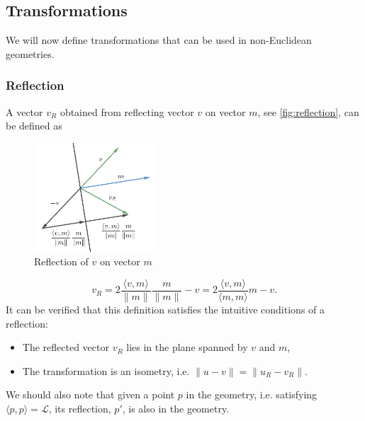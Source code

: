\subsection{Transformations}
We will now define transformations that can be used in non-Euclidean geometries.

\subsubsection{Reflection}
A vector $v_R$ obtained from reflecting vector $v$ on vector $m$, see \autoref{fig:reflection}, can be defined as
\begin{figure}[h]
    \centering
    \includegraphics[width=0.4\textwidth]{chapters/theoretical_foundations/sections/non-eudlidean-spaces/resources/reflection.png}
    \caption{Reflection of $v$ on vector $m$}
    \label{fig:reflection}
\end{figure}
$$v_R = 2 \frac{\langle v, m \rangle}{\lVert m \rVert}\frac{m}{\lVert m \rVert} - v = 2\frac{\langle v, m\rangle}{\langle m,m\rangle}m - v.$$
It can be verified that this definition satisfies the intuitive conditions of a reflection:
\begin{itemize}
    \item The reflected vector $v_R$ lies in the plane spanned by $v$ and $m$,
    \item The transformation is an isometry, i.e. $\lVert u - v \rVert = \lVert u_R - v_R \rVert$.
\end{itemize}
We should also note that given a point $p$ in the geometry, i.e. satisfying $\langle p, p \rangle = \mathcal{L}$, its reflection, $p'$, is also in the geometry.

